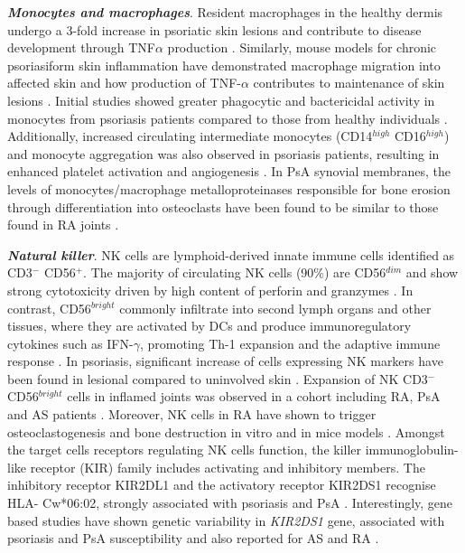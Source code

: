\textbf{\textit{Monocytes and macrophages}}. Resident macrophages in the healthy dermis undergo a 3-fold increase in psoriatic skin lesions and contribute to disease development through TNF$\alpha$ production \parencite{Perera2012, Mahil2016}. Similarly, mouse models for chronic psoriasiform skin inflammation have demonstrated macrophage migration into affected skin and how production of TNF-$\alpha$ contributes to maintenance of skin lesions \parencite{Stratis2006, Wang2006}. Initial studies showed greater phagocytic and bactericidal activity in monocytes from psoriasis patients compared to those from healthy individuals \parencite{Bar-Eli1979}. Additionally, increased circulating intermediate monocytes (CD14$^{high}$ CD16$^{high}$) and monocyte aggregation was also observed in psoriasis patients, resulting in enhanced platelet activation and angiogenesis \parencite {Golden2015}. In PsA synovial membranes, the levels of monocytes/macrophage metalloproteinases responsible for bone erosion through differentiation into osteoclasts have been found to be similar to those found in RA joints \parencite{Hitchon2002}. 

\textbf{\textit{Natural killer}}. NK cells are lymphoid-derived innate immune cells identified as CD3$^-$ CD56$^+$. The majority of circulating NK cells (90\%) are CD56$^{dim}$ and show strong cytotoxicity driven by high content of perforin and granzymes \parencite{Mandal2014}. In contrast, CD56$^{bright}$  commonly infiltrate into second lymph organs and other tissues, where they are activated by DCs and produce immunoregulatory cytokines such as IFN-$\gamma$, promoting Th-1 expansion and the adaptive immune response \parencite{Martin-Fontecha2004,Ferlazzo2004}. In psoriasis, significant increase of cells expressing NK markers have been found in lesional compared to uninvolved skin \parencite{Cameron2002,Ottaviani2006}.  %
Expansion of NK CD3$^-$ CD56$^{bright}$ cells in inflamed joints was observed in a cohort including RA, PsA and AS patients \parencite{Dalbeth2002}. Moreover, NK cells in RA have shown to trigger osteoclastogenesis and bone destruction in vitro and in mice models \parencite{Soderstrom2010} . %
Amongst the target cells receptors regulating NK cells function, the killer immunoglobulin-like receptor (KIR) family includes activating and inhibitory members. The inhibitory receptor KIR2DL1 and the activatory receptor KIR2DS1 recognise HLA- Cw*06:02, strongly associated with psoriasis and PsA \parencite{Tobin2011}. Interestingly, gene based studies have shown genetic variability in \textit{KIR2DS1} gene, associated with psoriasis and PsA susceptibility and also reported for AS and RA \parencite{Luszczek 2004, Williams2005,Carter2007, Yen2001}.


